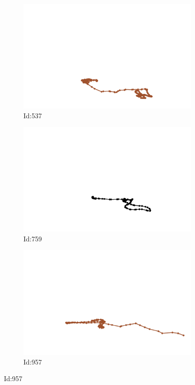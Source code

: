 \documentclass[12pt,twoside]{report}
\begin{document}
\begin{figure}
\centering
\begin{subfigure}[b]{0.20\textwidth}
\centering
\includegraphics[width=\textwidth]{../../trajectories/537.png}
\caption{Id:537}
\end{subfigure}
\begin{subfigure}[b]{0.20\textwidth}
\centering
\includegraphics[width=\textwidth]{../../trajectories/759.png}
\caption{Id:759}
\end{subfigure}
\begin{subfigure}[b]{0.20\textwidth}
\centering
\includegraphics[width=\textwidth]{../../trajectories/957.png}
\caption{Id:957}
\end{subfigure}
\end{figure}
\end{document}
